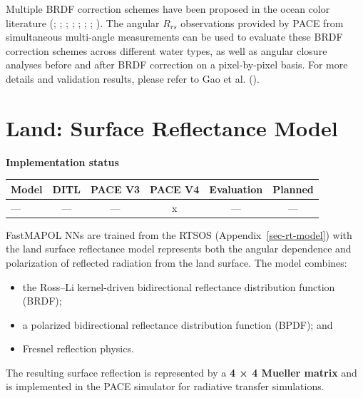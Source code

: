 \documentclass[
  11pt,
  letterpaper,
]{scrreprt}
\providecommand{\tightlist}{%
  \setlength{\itemsep}{0pt}\setlength{\parskip}{0pt}}
\begin{document}
Multiple BRDF correction schemes have been proposed in the ocean color
literature (;
; ; ;
;
;
;
). The angular \(R_{rs}\)
observations provided by PACE from simultaneous multi-angle measurements
can be used to evaluate these BRDF correction schemes across different
water types, as well as angular closure analyses before and after BRDF
correction on a pixel-by-pixel basis. For more details and validation
results, please refer to Gao et al. ().

\chapter{Land: Surface Reflectance Model}\label{sec-land-model}

\textbf{Implementation status}

\begin{longtable}[]{@{}lccccc@{}}
\toprule\noalign{}
Model & DITL & PACE V3 & PACE V4 & Evaluation & Planned \\
\midrule\noalign{}
\endhead
\bottomrule\noalign{}
\endlastfoot
--- & --- & --- & x & --- & --- \\
\end{longtable}

FastMAPOL NNs are trained from the RTSOS (Appendix~\ref{sec-rt-model})
with the land surface reflectance model represents both the angular
dependence and polarization of reflected radiation from the land
surface. The model combines:

\begin{itemize}
\tightlist
\item
  the Ross--Li kernel-driven bidirectional reflectance distribution
  function (BRDF);
\item
  a polarized bidirectional reflectance distribution function (BPDF);
  and
\item
  Fresnel reflection physics.
\end{itemize}

The resulting surface reflection is represented by a \textbf{4 × 4
Mueller matrix} and is implemented in the PACE simulator for radiative
transfer simulations.
\end{document}
